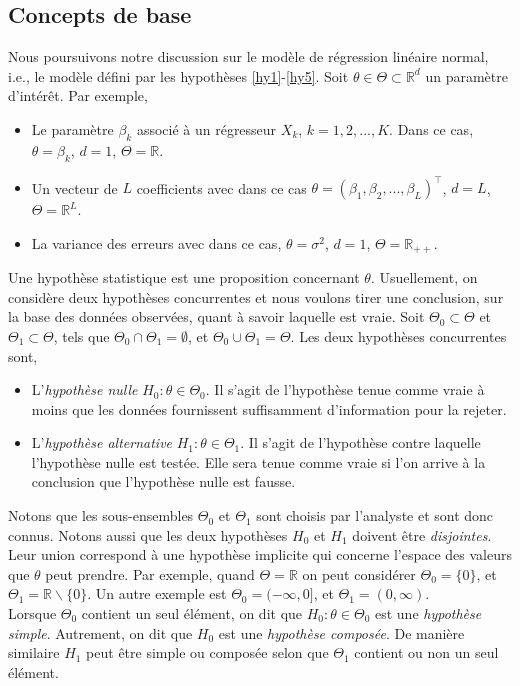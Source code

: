 \subsection{Concepts de base}
Nous poursuivons notre discussion sur le modèle de régression linéaire normal, i.e., le modèle défini par  les hypothèses \ref{hy1}-\ref{hy5}. Soit $\theta\in\Theta\subset \mathbb{R}^d$ un paramètre d'intérêt. Par exemple,
\begin{itemize}
\item Le paramètre $\beta_k$ associé à un régresseur $X_k$, $k=1,2,...,K$. Dans ce cas,
$\theta = \beta_k$, $d=1$, $\Theta = \mathbb{R}$.
\item  Un vecteur de $L$ coefficients avec dans ce cas $\theta = (\beta_1, \beta_2,...,\beta_L)^\top$, $d=L$, $\Theta = \mathbb{R}^L$.
\item La variance des erreurs avec dans ce cas, $\theta = \sigma^2$, $d=1$, $\Theta = \mathbb{R}_{++}$.
\end{itemize}
Une hypothèse statistique est une proposition concernant $\theta$. Usuellement, on considère deux hypothèses concurrentes et nous voulons tirer une conclusion, sur la base des données observées, quant à savoir laquelle est vraie. Soit $\Theta_0\subset\Theta$ et  $\Theta_1\subset\Theta$, tels que $\Theta_0 \cap \Theta_1 = \emptyset$, et $\Theta_0 \cup \Theta_1=\Theta$. Les deux hypothèses concurrentes sont,
\begin{itemize}
\item L'\emph{hypothèse nulle} $H_0: \theta\in \Theta_0$. Il s'agit de l'hypothèse tenue comme vraie à moins que les données fournissent suffisamment d'information pour la rejeter.
\item L'\emph{hypothèse alternative} $H_1: \theta\in \Theta_1$. Il s'agit de l'hypothèse contre laquelle l'hypothèse nulle est testée. Elle sera tenue comme vraie si l'on arrive à la conclusion que l'hypothèse nulle est fausse.
\end{itemize}
Notons que les sous-ensembles $\Theta_0$ et $\Theta_1$ sont choisis par l'analyste et sont donc connus. Notons aussi que les deux hypothèses $H_0$ et $H_1$ doivent être
\emph{disjointes}. Leur union correspond à une hypothèse implicite qui concerne l'espace des valeurs que $\theta$ peut prendre. Par exemple, quand $\Theta = \mathbb{R}$ on peut considérer $\Theta_0 = \{0\}$, et $\Theta_1 = \mathbb{R}  \backslash \{0\}$. Un autre exemple est $\Theta_0 = (-\infty, 0]$, et $\Theta_1 = (0, \infty)$.\\
Lorsque $\Theta_0$ contient un seul élément, on dit que $H_0:\theta\in \Theta_0$ est une \emph{hypothèse simple}. Autrement, on dit que $H_0$ est une \emph{hypothèse composée}. De manière similaire $H_1$ peut être simple ou composée selon que $\Theta_1$ contient ou non un seul élément.\\
